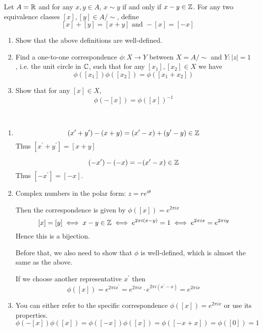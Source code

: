 \begin{prbm}
Let $A = \mathbb R$ and for any $x, y \in A$, $x \sim y$ if and only if $x-y \in \mathbb Z$. For any two equivalence classes $[x], [y] \in A/\sim$, define
\[ [x] + [y] = [x + y] \text{ and } -[x] = [-x] \]
\begin{enumerate}[label=(\alph*)]
\item Show that the above definitions are well-defined.
\item Find a one-to-one correspondence $\phi:X \to Y$ between $X = A/\sim$ and $Y:|z| = 1$, i.e. the unit circle in $\mathbb C$, such that for any $[x_1], [x_2] \in X$ we have
\[ \phi([x_1])\phi([x_2]) = \phi([x_1 + x_2]) \]
\item Show that for any $[x] \in X$,
\[ \phi(-[x]) = \phi([x])^{-1} \]
\end{enumerate}
\end{prbm}

\begin{solution} \ 
\begin{enumerate}[label=(\alph*)]
\item 
\[ (x^\prime+y^\prime)-(x+y)=(x^\prime-x)+(y^\prime-y)\in \mathbb Z \]
Thus $[x^\prime+y^\prime]=[x+y]$

\[ (-x^\prime)-(-x)=-(x^\prime-x)\in \mathbb Z \]
Thus $[-x^\prime]=[-x]$.

\item Complex numbers in the polar form: $z=re^{i\theta}$

Then the correspondence is given by $\phi([x])=e^{2\pi ix}$
\[ [x]=[y] \iff x-y\in \mathbb Z \iff e^{2\pi i(x-y)}=1 \iff e^{2\pi ix}=e^{2\pi iy} \]
Hence this is a bijection.

Before that, we also need to show that $\phi$ is well-defined, which is almost the same as the above.

If we choose another representative $x^\prime$ then
\[ \phi([x])=e^{2\pi ix^\prime} = e^{2\pi ix}\cdot e^{2\pi i(x^\prime-x)} = e^{2\pi ix} \]

\item You can either refer to the specific correspondence $\phi([x])=e^{2\pi ix}$ or use its properties.
\[ \phi(-[x])\phi([x]) = \phi([-x])\phi([x]) = \phi([-x+x]) = \phi([0]) = 1 \]
\end{enumerate}
\end{solution}
\pagebreak


